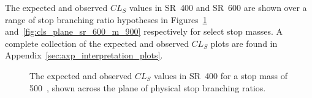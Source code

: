 The expected and observed $CL_S$ values in SR~400 and SR~600 are shown
over a range of stop branching ratio hypotheses in
Figures~\ref{fig:cls_plane_sr_400_m_500} and~\ref{fig:cls_plane_sr_600_m_900}
respectively for select stop masses.
A complete collection of the expected and observed $CL_S$ plots are found in
Appendix~\ref{sec:axp_interpretation_plots}.

\begin{figure}[ht]
  \centering
  \caption{
    The expected and observed $CL_S$ values in SR~400 for a stop mass of
    500~\GeV, shown across the plane of physical stop branching ratios.
  }
  \label{fig:cls_plane_sr_400_m_500}
\end{figure}


